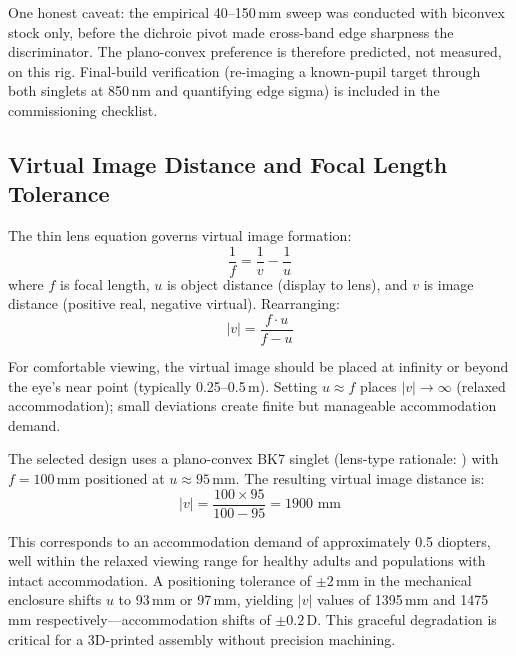One honest caveat: the empirical 40--150\,mm sweep was conducted with biconvex stock only, before the dichroic pivot made cross-band edge sharpness the discriminator. The plano-convex preference is therefore predicted, not measured, on this rig. Final-build verification (re-imaging a known-pupil target through both singlets at 850\,nm and quantifying edge sigma) is included in the  commissioning checklist.



\subsection{Virtual Image Distance and Focal Length Tolerance}
\label{sec:hw-virtual-image}

The thin lens equation governs virtual image formation:
%
\begin{equation}
    \frac{1}{f} = \frac{1}{v} - \frac{1}{u}
\end{equation}
%
where $f$ is focal length, $u$ is object distance (display to lens), and $v$ is image distance (positive real, negative virtual). Rearranging:
%
\begin{equation}
    |v| = \frac{f \cdot u}{f - u}
\end{equation}

For comfortable viewing, the virtual image should be placed at infinity or beyond the eye's near point (typically 0.25--0.5\,m). Setting $u \approx f$ places $|v| \to \infty$ (relaxed accommodation); small deviations create finite but manageable accommodation demand.

The selected design uses a plano-convex BK7 singlet (lens-type rationale: ) with $f = 100$\,mm positioned at $u \approx 95$\,mm. The resulting virtual image distance is:
%
\begin{equation}
    |v| = \frac{100 \times 95}{100 - 95} = 1900 \text{ mm}
\end{equation}

This corresponds to an accommodation demand of approximately 0.5 diopters, well within the relaxed viewing range for healthy adults and  populations with intact accommodation. A positioning tolerance of $\pm 2$\,mm in the mechanical enclosure shifts $u$ to 93\,mm or 97\,mm, yielding $|v|$ values of 1395\,mm and 1475\,mm respectively---accommodation shifts of $\pm 0.2$\,D. This graceful degradation is critical for a 3D-printed assembly without precision machining.

